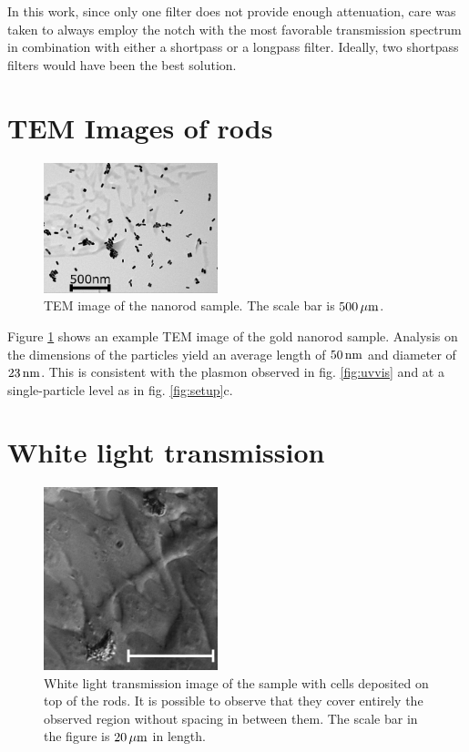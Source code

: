 In this work, since only one filter does not provide enough attenuation, care was
taken to always employ the notch with the most favorable transmission spectrum
in combination with either a shortpass or a longpass filter. Ideally, two
shortpass filters would have been the best solution.
 
 \section{TEM Images of rods}
 
\begin{figure}[htp]
 \centering
 \includegraphics[width=0.45\textwidth]{Chapters/03_Background_Free/Figures/Supplementary/04_TEM/tem.png}
 \caption{TEM image of the nanorod sample. The scale bar is $500\,\mu\textrm{m}$. }
 \label{fig:TEM}
 \end{figure}
 
Figure \ref{fig:TEM} shows an example TEM image of the gold nanorod sample.
Analysis on the dimensions of the particles yield an average length of $50\,\textrm{nm}$
and diameter of $23\,\textrm{nm}$. This is consistent with the plasmon observed in fig.
\ref{fig:uvvis} and at a single-particle level as in fig. \ref{fig:setup}c.

\section{White light transmission}
\begin{figure}[htp]
\centering
	\includegraphics[width=0.45\textwidth]{Chapters/03_Background_Free/Figures/Supplementary/05_White_Light/white_light_scale.png}
	\caption{White light transmission image of the sample with cells deposited on
	top of the rods. It is possible to observe that they cover entirely the
	observed region without spacing in between them. The scale bar in the figure
	is $20\,\mu\textrm{m}$ in length.}
	\label{fig:white-light}
\end{figure}

